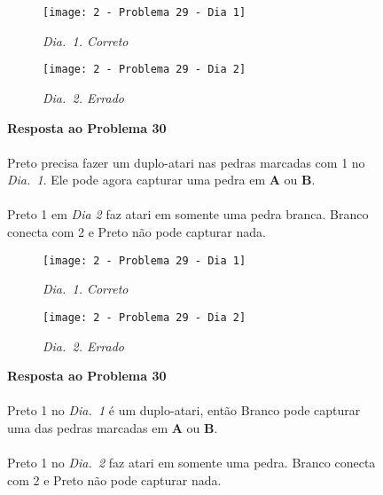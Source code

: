 \begin{SCfigure}[][h!]
    \begin{subfigure}[t]{.31\textwidth}
        \texttt{[image: 2 - Problema 29 - Dia 1]}
        \caption*{\emph{Dia.\@~1. Correto}}
    \end{subfigure}
    \hfill
    \begin{subfigure}[t]{.31\textwidth}
        \texttt{[image: 2 - Problema 29 - Dia 2]}
        \caption*{\emph{Dia.\@~2. Errado}}
    \end{subfigure}
    \hfill
    \caption*{\textbf{Resposta ao Problema 30}\\\\Preto precisa fazer um duplo-atari  nas pedras marcadas com 1 no \emph{Dia.\@~1}. Ele pode agora capturar uma pedra em \textbf{A} ou \textbf{B}.\\\\Preto 1 em \emph{Dia 2} faz atari em somente uma pedra branca. Branco conecta com 2 e Preto não pode capturar nada.}
\end{SCfigure}

\vfill

\begin{SCfigure}[][h!]
    \begin{subfigure}[t]{.31\textwidth}
        \texttt{[image: 2 - Problema 29 - Dia 1]}
        \caption*{\emph{Dia.\@~1. Correto}}
    \end{subfigure}
    \hfill
    \begin{subfigure}[t]{.31\textwidth}
        \texttt{[image: 2 - Problema 29 - Dia 2]}
        \caption*{\emph{Dia.\@~2. Errado}}
    \end{subfigure}
    \hfill
    \caption*{\textbf{Resposta ao Problema 30}\\\\Preto 1 no \emph{Dia.\@~1} é um duplo-atari, então Branco pode capturar uma das pedras marcadas em \textbf{A} ou \textbf{B}.\\\\Preto 1 no \emph{Dia.\@~2} faz atari em somente uma pedra. Branco conecta com 2 e Preto não pode capturar nada.}
\end{SCfigure}